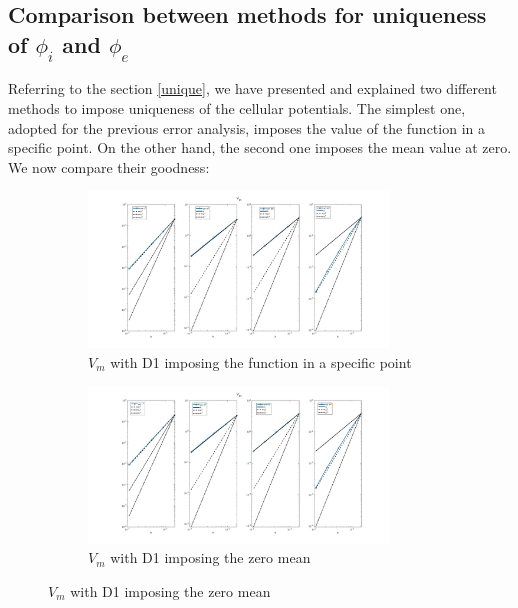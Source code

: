 \documentclass[a4paper,11pt]{article}
\begin{document}
\subsection{Comparison between methods for uniqueness of $\phi_i$ and $\phi_e$}
Referring to the section \ref{unique}, we have presented and explained two different methods to impose uniqueness of the cellular potentials.
The simplest one, adopted for the previous error analysis, imposes the value of the function in a specific point. On the other hand, the second one imposes the mean value at zero.
We now compare their goodness:
\begin{figure}[h]
\begin{subfigure}{0.5\textwidth}
\includegraphics[width = 8cm]{./D1_Vm_1.jpg}
\caption*{$V_m$ with D1 imposing the function in a specific point}
\label{Vm_1}
\end{subfigure}
\begin{subfigure}{0.5\textwidth}
\includegraphics[width =8cm]{./D1_Vm_2.jpg}
\caption*{$V_m$ with D1 imposing the zero mean}
\label{Vm_2}
\end{subfigure}
\end{figure}
\end{document}
